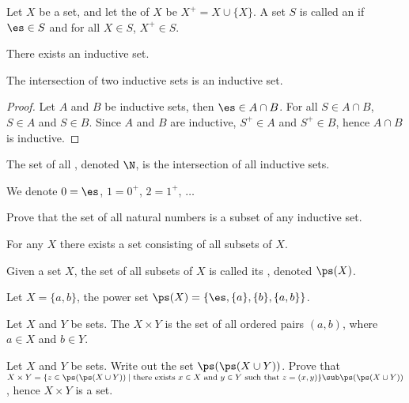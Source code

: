 \documentclass[10pt]{article}
\begin{document}
\begin{definition}
    Let $X$ be a set, and let the  of $X$ be ${X}^{+}=X\cup\{X\}$. A set $S$ is called an  if $\es\in S$ and for all $X\in S$, ${X}^{+}\in S$.
\end{definition}
\begin{Axiom of infinity}
    There exists an inductive set.
\end{Axiom of infinity}
\begin{proposition}
    The intersection of two inductive sets is an inductive set.
\end{proposition}
\begin{proof}
    Let $A$ and $B$ be inductive sets, then $\es\in A\cap B$. For all $S\in A\cap B$, $S\in A$ and $S\in B$. Since $A$ and $B$ are inductive, ${S}^{+}\in A$ and ${S}^{+}\in B$, hence $A\cap B$ is inductive.
\end{proof}
\par
\begin{definition}
    The set of all , denoted $\N$, is the intersection of all inductive sets. 
\end{definition}
\par
We denote $0=\es$, $1={0}^{+}$, $2={1}^{+}$, $\dots$
\begin{problem}
    Prove that the set of all natural numbers is a subset of any inductive set.
\end{problem}
\begin{Axiom of power set}
    For any $X$ there exists a set consisting of all subsets of $X$.
\end{Axiom of power set}
\begin{definition}
    Given a set $X$, the set of all subsets of $X$ is called its , denoted $\ps(X)$.
\end{definition}
\begin{example}
    Let $X=\{a,b\}$, the power set $\ps(X)=\{\es,\{a\},\{b\},\{a,b\}\}$.
\end{example}
\begin{definition}
    Let $X$ and $Y$ be sets. The  $X\times Y$ is the set of all ordered pairs $(a,b)$, where $a\in X$ and $b\in Y$.
\end{definition}
\begin{problem}
    Let $X$ and $Y$ be sets. Write out the set $\ps(\ps(X\cup Y))$. Prove that $X\times Y=\{z\in\ps(\ps(X\cup Y))\mid\text{there exists}\ x\in X\ \text{and}\ y\in Y\ \text{such that}\ z=(x,y)\}\sub\ps(\ps(X\cup Y))$, hence $X\times Y$ is a set.
\end{problem}
\end{document}
